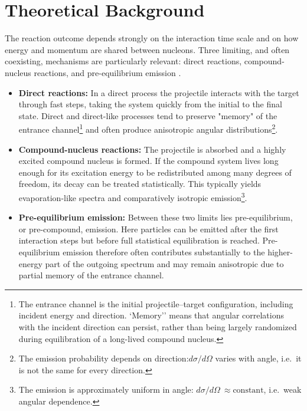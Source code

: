 \section{Theoretical Background}

The reaction outcome depends strongly on the interaction time scale and on how energy and momentum are shared between nucleons. Three limiting, and often coexisting, mechanisms are particularly relevant: direct reactions, compound-nucleus reactions, and pre-equilibrium emission \cite{preeq_image,koning2025talys}.

\begin{itemize}
\item \textbf{Direct reactions:} In a direct process the projectile interacts with the target through fast steps,
taking the system quickly from the initial to the final state. Direct and direct-like processes tend to
preserve "memory" of the entrance channel\footnote{The entrance channel is the initial projectile--target configuration, including incident energy and direction. `Memory'' means that angular correlations with the incident direction can persist, rather than being largely randomized during equilibration of a long-lived compound nucleus.}
and often produce anisotropic angular distributions\footnote{The emission probability depends on direction:\(d\sigma/d\Omega\) varies with angle, i.e.\ it is not the same for every direction.}.


\item \textbf{Compound-nucleus reactions:} The projectile is absorbed and a highly excited compound nucleus is formed.
If the compound system lives long enough for its excitation energy to be redistributed among many degrees
of freedom, its decay can be treated statistically. This typically yields evaporation-like spectra and
comparatively isotropic emission\footnote{The emission is approximately uniform in angle: \(d\sigma/d\Omega\ \approx \text{constant}\), i.e.\ weak angular dependence.}.

\item \textbf{Pre-equilibrium emission:} Between these two limits lies pre-equilibrium, or pre-compound, emission.
Here particles can be emitted after the first interaction steps but before full statistical equilibration is reached.
Pre-equilibrium emission therefore often contributes substantially to the higher-energy part of the outgoing
spectrum and may remain anisotropic due to partial memory of the entrance channel.

\end{itemize}

